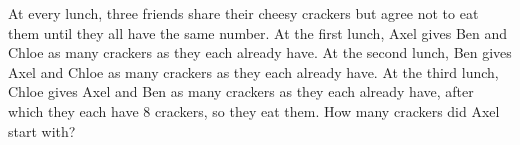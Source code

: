 At every lunch, three friends share their cheesy crackers but agree not to eat them until they all have the same number. At the first lunch, Axel gives Ben and Chloe as many crackers as they each already have. At the second lunch, Ben gives Axel and Chloe as many crackers as they each already have. At the third lunch, Chloe gives Axel and Ben as many crackers as they each already have, after which they each have $8$ crackers, so they eat them. How many crackers did Axel start with?
